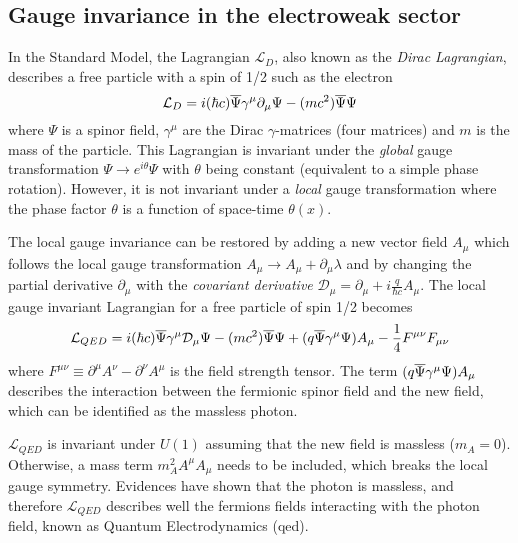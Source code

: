 \subsection{Gauge invariance in the electroweak sector}

In the Standard Model, the Lagrangian $\mathcal{L}_{D}$, also known as the \textit{Dirac Lagrangian}, describes a free particle with a spin of 1/2 such as the electron \cite{Griffiths:343277}
\begin{equation}
  \mathcal{L}_{D} = i(\hbar c)\overline{\rm \Psi}\gamma^{\mu}\partial_{\mu}\Psi - (mc^2)\overline{\rm \Psi}\Psi
\end{equation}
where $\Psi$ is a spinor field, $\gamma^{\mu}$ are the Dirac $\gamma$-matrices (four matrices) \cite{Peskin:1995ev} and $m$ is the mass of the particle. This Lagrangian is invariant under the \textit{global} gauge transformation $\Psi \rightarrow e^{i\theta}\Psi$ with $\theta$ being constant (equivalent to a simple phase rotation). However, it is not invariant under a \textit{local} gauge transformation where the phase factor $\theta$ is a function of space-time $\theta(x)$.

The local gauge invariance can be restored by adding a new vector field $A_{\mu}$ which follows the local gauge transformation $A_{\mu} \rightarrow A_{\mu} + \partial_{\mu}\lambda$ and by changing the partial derivative $\partial_{\mu}$ with the \textit{covariant derivative} $\mathcal{D}_{\mu} = \partial_{\mu} + i\frac{q}{\hbar c}A_{\mu}$. The local gauge invariant Lagrangian for a free particle of spin 1/2 becomes \cite{Griffiths:343277}
\begin{equation}
  \mathcal{L}_{QED} = i(\hbar c)\overline{\rm \Psi}\gamma^{\mu}\mathcal{D}_{\mu}\Psi - (mc^2)\overline{\rm \Psi}\Psi + (q\overline{\rm \Psi}\gamma^{\mu}\Psi)A_{\mu} - \frac{1}{4}F^{\mu\nu}F_{\mu\nu}
\end{equation}
where $F^{\mu\nu} \equiv \partial^{\mu}A^{\nu} - \partial^{\nu}A^{\mu}$ is the field strength tensor. The term $(q\overline{\rm \Psi}\gamma^{\mu}\Psi)A_{\mu}$ describes the interaction between the fermionic spinor field and the new field, which can be identified as the massless photon.

$\mathcal{L}_{QED}$ is invariant under $U(1)$ assuming that the new field is massless ($m_{A} = 0$). Otherwise, a mass term $m_{A}^2A^{\mu}A_{\mu}$ needs to be included, which breaks the local gauge symmetry. Evidences \cite{Lakes:1998mi, Chibisov:1976mm, Williams:1971ms} have shown that the photon is massless, and therefore $\mathcal{L}_{QED}$ describes well the fermions fields interacting with the photon field, known as Quantum Electrodynamics (\acrshort{qed}).

